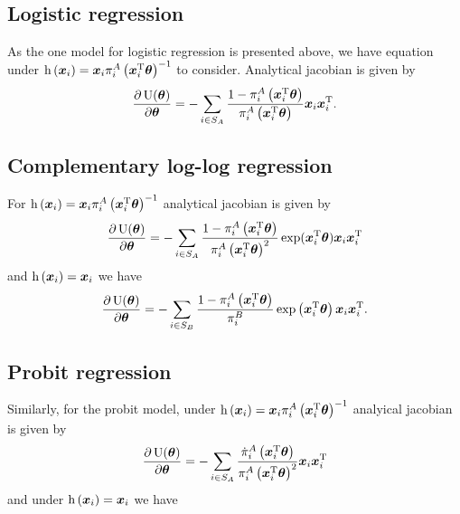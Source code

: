 \documentclass[
  letterpaper,
  DIV=11,
  numbers=noendperiod]{scrreprt}
\begin{document}
\hypertarget{logistic-regression-1}{%
\subsection{Logistic regression}\label{logistic-regression-1}}

As the one model for logistic regression is presented above, we have
equation under
\(\operatorname{h}\left(\boldsymbol{x}_i\right) = \boldsymbol{x}_i \pi_i^A\left(\boldsymbol{x}_i^{\mathrm{T}} \boldsymbol{\theta} \right)^{-1}\)
to consider. Analytical jacobian is given by \[
    \frac{\partial \operatorname{U}(\boldsymbol{\theta})}{\partial \boldsymbol{\theta}} = -\sum_{i \in S_A} \frac{1 - \pi_i^A\left(\boldsymbol{x}_i^{\mathrm{T}} \boldsymbol{\theta} \right)}{\pi_i^A\left(\boldsymbol{x}_i^{\mathrm{T}} \boldsymbol{\theta} \right)} \boldsymbol{x}_i \boldsymbol{x}_i^{\mathrm{T}}.
\]

\hypertarget{complementary-log-log-regression-1}{%
\subsection{Complementary log-log
regression}\label{complementary-log-log-regression-1}}

For
\(\operatorname{h}\left(\boldsymbol{x}_i\right) = \boldsymbol{x}_i \pi_i^A\left(\boldsymbol{x}_i^{\mathrm{T}} \boldsymbol{\theta} \right)^{-1}\)
analytical jacobian is given by \[
    \frac{\partial \operatorname{U}(\boldsymbol{\theta})}{\partial \boldsymbol{\theta}} = - \sum_{i \in S_A} \frac{1 - \pi_i^A\left(\boldsymbol{x}_i^{\mathrm{T}} \boldsymbol{\theta} \right)}{\pi_i^A\left(\boldsymbol{x}_i^{\mathrm{T}} \boldsymbol{\theta} \right)^2} \exp(\boldsymbol{x}_i^{\mathrm{T}} \boldsymbol{\theta}) \boldsymbol{x}_i \boldsymbol{x}_i^{\mathrm{T}}
\] and \(\operatorname{h}\left(\boldsymbol{x}_i\right) = \boldsymbol{x}_i\) we have \[
    \frac{\partial \operatorname{U}(\boldsymbol{\theta})}{\partial \boldsymbol{\theta}} = - \sum_{i \in S_B} \frac{1 - \pi_i^A\left(\boldsymbol{x}_i^{\mathrm{T}} \boldsymbol{\theta} \right)}{\pi_i^B} \exp \left(\boldsymbol{x}_i^\mathrm{T} \boldsymbol{\theta}\right) \boldsymbol{x}_i \boldsymbol{x}_i^{\mathrm{T}}.
\]

\hypertarget{probit-regression-1}{%
\subsection{Probit regression}\label{probit-regression-1}}

Similarly, for the probit model, under
\(\operatorname{h}\left(\boldsymbol{x}_i\right) = \boldsymbol{x}_i \pi_i^A\left(\boldsymbol{x}_i^{\mathrm{T}} \boldsymbol{\theta} \right)^{-1}\)
analyical jacobian is given by \[
    \frac{\partial \operatorname{U}(\boldsymbol{\theta})}{\partial \boldsymbol{\theta}} = - \sum_{i \in S_A} \frac{\dot{\pi}_i^A\left(\boldsymbol{x}_i^{\mathrm{T}} \boldsymbol{\theta} \right)}{\pi_i^A\left(\boldsymbol{x}_i^{\mathrm{T}} \boldsymbol{\theta} \right)^2} \boldsymbol{x}_i \boldsymbol{x}_i^{\mathrm{T}}
\] and under \(\operatorname{h}\left(\boldsymbol{x}_i\right) = \boldsymbol{x}_i\) we have
\end{document}
